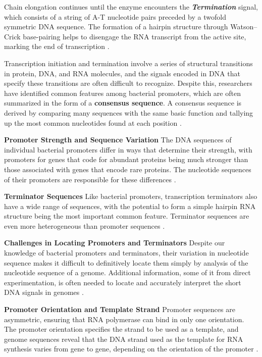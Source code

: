 Chain elongation continues until the enzyme encounters the \textbf{\textit{Termination}} signal, which consists of a string of A-T nucleotide pairs preceded by a twofold symmetric DNA sequence. The formation of a hairpin structure through Watson–Crick base-pairing helps to disengage the RNA transcript from the active site, marking the end of transcription \cite*{L1-Chapter6}.

Transcription initiation and termination involve a series of structural transitions in protein, DNA, and RNA molecules, and the signals encoded in DNA that specify these transitions are often difficult to recognize. Despite this, researchers have identified common features among bacterial promoters, which are often summarized in the form of a \textbf{consensus sequence}. A consensus sequence is derived by comparing many sequences with the same basic function and tallying up the most common nucleotides found at each position \cite*{L1-Chapter6}.

\textbf{Promoter Strength and Sequence Variation}
The DNA sequences of individual bacterial promoters differ in ways that determine their strength, with promoters for genes that code for abundant proteins being much stronger than those associated with genes that encode rare proteins. The nucleotide sequences of their promoters are responsible for these differences \cite*{L1-Chapter6}.

\textbf{Terminator Sequences}
Like bacterial promoters, transcription terminators also have a wide range of sequences, with the potential to form a simple hairpin RNA structure being the most important common feature. Terminator sequences are even more heterogeneous than promoter sequences \cite*{L1-Chapter6}.

\textbf{Challenges in Locating Promoters and Terminators}
Despite our knowledge of bacterial promoters and terminators, their variation in nucleotide sequence makes it difficult to definitively locate them simply by analysis of the nucleotide sequence of a genome. Additional information, some of it from direct experimentation, is often needed to locate and accurately interpret the short DNA signals in genomes \cite*{L1-Chapter6}.

\textbf{Promoter Orientation and Template Strand}
Promoter sequences are asymmetric, ensuring that RNA polymerase can bind in only one orientation. The promoter orientation specifies the strand to be used as a template, and genome sequences reveal that the DNA strand used as the template for RNA synthesis varies from gene to gene, depending on the orientation of the promoter \cite*{L1-Chapter6}.

